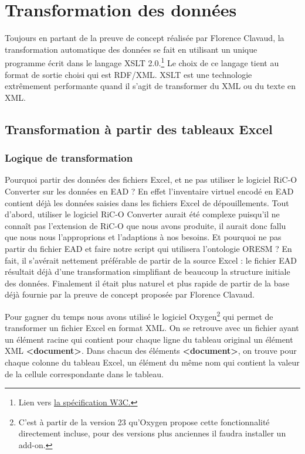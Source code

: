 \chapter{Transformation des données}
Toujours en partant de la preuve de concept réalisée par Florence Clavaud, la transformation automatique des données se fait en utilisant un unique programme écrit dans le langage XSLT 2.0.\footnote{Lien vers \href{https://www.w3.org/TR/xslt20/}{la spécification W3C.}} Le choix de ce langage tient au format de sortie choisi qui est RDF/XML. XSLT est une technologie extrêmement performante quand il s'agit de transformer du XML ou du texte en XML.
\section{Transformation à partir des tableaux Excel}
\subsection{Logique de transformation}
Pourquoi partir des données des fichiers Excel, et ne pas utiliser le logiciel RiC-O Converter sur les données en EAD ? En effet l'inventaire virtuel encodé en EAD contient déjà les données saisies dans les fichiers Excel de dépouillements. Tout d'abord, utiliser le logiciel RiC-O Converter aurait été complexe puisqu'il ne connaît pas l'extension de RiC-O que nous avons produite, il aurait donc fallu que nous nous l'approprions et l'adaptions à nos besoins. Et pourquoi ne pas partir du fichier EAD et faire notre script qui utilisera l'ontologie ORESM ? En fait, il s'avérait nettement préférable de partir de la source Excel : le fichier EAD résultait déjà d'une transformation simplifiant de beaucoup la structure initiale des données. Finalement il était plus naturel et plus rapide de partir de la base déjà fournie par la preuve de concept proposée par Florence Clavaud. 
\par
Pour gagner du temps nous avons utilisé le logiciel Oxygen\footnote{C'est à partir de la version 23 qu'Oxygen propose cette fonctionnalité directement incluse, pour des versions plus anciennes il faudra installer un add-on.} qui permet de transformer un fichier Excel en format XML. On se retrouve avec un fichier ayant un élément racine qui contient pour chaque ligne du tableau original un élément XML \textbf{<document>}. Dans chacun des éléments \textbf{<document>}, on trouve pour chaque colonne du tableau Excel, un élément du même nom qui contient la valeur de la cellule correspondante dans le tableau.
